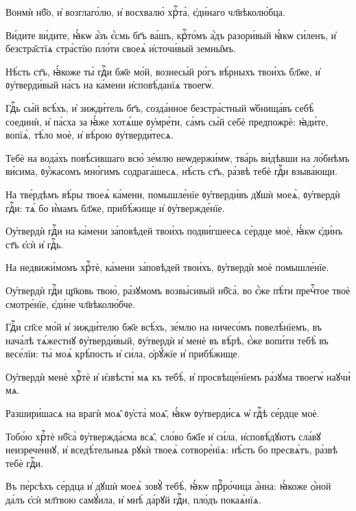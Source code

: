 \hKv Вонмѝ нб҃о, и҆ возглаго́лю, и҆ восхвалю̀ хрⷭ҇та̀,  є҆ди́наго чл҃вѣколю́бца. 

\hKv Ви́дите ви́дите, ꙗ҆́кѡ а҆́зъ є҆́смь бг҃ъ ва́шъ, крⷭ҇то́мъ  а҆́дъ разори́вый ꙗ҆́кѡ си́ленъ, и҆ безстра̑стїѧ стра́стїю  пло́ти своеѧ̀ и҆сточи́вый земны̑мъ.  
%

\hKv Нѣ́сть ст҃ъ, ꙗ҆́коже ты̀ гдⷭ҇и бж҃е мо́й, вознесы́й ро́гъ  вѣ́рныхъ твои́хъ бл҃же, и҆ ᲂу҆тверди́вый на́съ на ка́мени  и҆сповѣ́данїѧ твоегѡ̀. 
%

\hKv Гдⷭ҇ь сы́й всѣ́хъ, и҆ зижди́тель  бг҃ъ, созда́нное безстра́стный ѡ҆бнища́въ себѣ̀ соединѝ,  и҆ па́сха за ꙗ҆́же хотѧ́ше ᲂу҆мре́ти, са́мъ сы́й себѐ  предпожрѐ: ꙗ҆ди́те, вопїѧ̀, тѣ́ло моѐ, и҆ вѣ́рою  ᲂу҆тверди́тесѧ. 
%

\hKv Тебѐ на вода́хъ повѣ́сившаго всю̀  зе́млю неѡдержи́мѡ, тва́рь ви́дѣвши на ло́бнѣмъ ви́сима,  ᲂу҆́жасомъ мно́гимъ содрага́шесѧ, нѣ́сть ст҃ъ, ра́звѣ  тебѐ гдⷭ҇и взыва́ющи. 
%

\hKv На тве́рдѣмъ вѣ́ры твоеѧ̀ ка́мени, помышле́нїе  ᲂу҆тверди́въ дꙋшѝ моеѧ̀, ᲂу҆твердѝ гдⷭ҇и: тѧ́ бо и҆́мамъ  бл҃же, прибѣ́жище и҆ ᲂу҆твержде́нїе.  

\hKv Оу҆твердѝ гдⷭ҇и на ка́мени за́повѣдей твои́хъ  подви́гшеесѧ се́рдце моѐ, ꙗ҆́кѡ є҆ди́нъ ст҃ъ є҆сѝ и҆  гдⷭ҇ь. 

\hKv На недвижи́момъ хрⷭ҇тѐ, ка́мени за́повѣдей твои́хъ,  ᲂу҆твердѝ моѐ помышле́нїе. 

\hKv Оу҆твердѝ гдⷭ҇и цр҃ковь твою̀, ра́зꙋмомъ возвы́сивый  нб҃са̀, во є҆́же пѣ́ти пречⷭ҇тое твоѐ смотре́нїе,  є҆ди́не чл҃вѣколю́бче.  

\hKv Гдⷭ҇и сп҃се мо́й и҆ зижди́телю бж҃е всѣ́хъ, зе́млю на  ничесо́мъ повелѣ́нїемъ, въ нача́лѣ тѧ́жестнꙋ  ᲂу҆тверди́вый, ᲂу҆твердѝ и҆ менѐ въ вѣ́рѣ, є҆́же  вопи́ти тебѣ̀ въ весе́лїи: ты̀ моѧ̀ крѣ́пость и҆ си́ла,  ѻ҆рꙋ́жїе и҆ прибѣ́жище. 

\hKv Оу҆твердѝ менѐ хрⷭ҇тѐ и҆ и҆звѣсти́ мѧ къ тебѣ̀, и҆  просвѣще́нїемъ ра́зꙋма твоегѡ̀ наꙋчи́ мѧ. 

\hKv Разшири́шасѧ на врагѝ моѧ̑ ᲂу҆ста̀ моѧ̑, ꙗ҆́кѡ  ᲂу҆тверди́сѧ ѡ҆ гдⷭ҇ѣ се́рдце моѐ. 

\hKv Тобо́ю хрⷭ҇тѐ нб҃са̀ ᲂу҆твержда́єма всѧ̑, сло́во бж҃їе и҆  си́ла, и҆сповѣ́дꙋютъ сла́вꙋ неизрече́ннꙋ,  и҆ вседѣ́тельныѧ рꙋкѝ твоеѧ̀ сотворе́нїѧ:  нѣ́сть бо пресвѧ́тъ, ра́звѣ тебѐ гдⷭ҇и. 

\hKv Въ пе́рсѣхъ се́рдца и҆ дꙋшѝ моеѧ̀ зовꙋ̀ тебѣ̀, ꙗ҆́кѡ  прⷪ҇ро́чица а҆́нна: ꙗ҆́коже ѻ҆́ной да́лъ є҆сѝ мл҃твою  самꙋ́ила, и҆ мнѣ̀ да́рꙋй гдⷭ҇и, пло́дъ покаѧ́нїѧ. 

